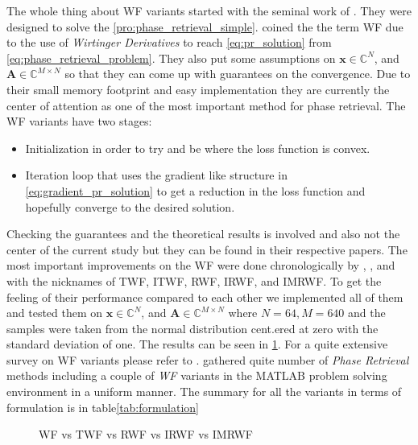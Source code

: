 The whole thing about \ac{WF} variants started with the seminal work of \cite{Candes2014}. They were designed to solve the \cref{pro:phase_retrieval_simple}. 
\cite{Candes2014} coined the the term \ac{WF} due to the use of \emph{Wirtinger Derivatives}\cite{Wirtinger1927} to reach \cref{eq:pr_solution} from \cref{eq:phase_retrieval_problem}. They 
also put some assumptions on $\boldsymbol{x} \in \mathbb{C}^N$, and $\boldsymbol{A} \in \mathbb{C}^{M \times N}$ so that they can 
come up with guarantees on the convergence. Due to their small memory footprint and easy implementation they are currently the center of attention as one of the 
most important method for phase retrieval.   
The \ac{WF} variants have two stages:
\begin{itemize}
  \item Initialization in order to try and be where the loss function is convex.
  \item Iteration loop that uses the gradient like structure in \cref{eq:gradient_pr_solution} to get a reduction in the 
  loss function and hopefully converge to the desired solution. 
\end{itemize}

Checking the guarantees and the theoretical results is involved and also not the center of the current study but they can be found in their respective papers. 
The most important improvements on the \ac{WF} were done chronologically by \cite{Chen2015}, \cite{Kolte2016}, and \cite{Zhang2016}
with the nicknames of \ac{TWF}, \ac{ITWF}, \ac{RWF}, \ac{IRWF}, and \ac{IMRWF}. To get the feeling of their performance compared to each other we implemented 
all of them and tested them on $\boldsymbol{x} \in \mathbb{C}^N$, and $\boldsymbol{A} \in \mathbb{C}^{M \times N}$ 
where $N = 64, M = 640$ and the samples were taken from the normal distribution cent.ered at zero with the standard deviation of one. 
The results can be seen in \cref{fig:wf_variants}. For a quite extensive survey on \ac{WF} variants please refer to \cite{Liu2019}. \cite{Chandra2017} 
gathered quite number of \emph{Phase Retrieval} methods including a couple of \emph{\ac{WF}} variants in the MATLAB\textregistered\space 
problem solving environment in a uniform manner. The summary for all the variants in terms of formulation is in table\ref{tab:formulation}  

\begin{figure}
  \centering
\captionsetup{justification=centering}
  
\caption{\ac{WF} vs \ac{TWF} vs \ac{RWF} vs \ac{IRWF} vs \ac{IMRWF}}
  \label{fig:wf_variants}
\end{figure}







